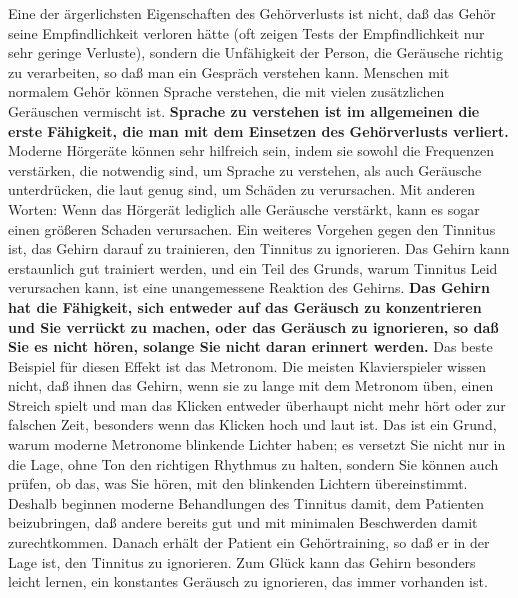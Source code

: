 Eine der ärgerlichsten Eigenschaften des Gehörverlusts ist nicht, daß das Gehör seine Empfindlichkeit verloren hätte (oft zeigen Tests der Empfindlichkeit nur sehr geringe Verluste), sondern die Unfähigkeit der Person, die Geräusche richtig zu verarbeiten, so daß man ein Gespräch verstehen kann.
Menschen mit normalem Gehör können Sprache verstehen, die mit vielen zusätzlichen Geräuschen vermischt ist.
\textbf{Sprache zu verstehen ist im allgemeinen die erste Fähigkeit, die man mit dem Einsetzen des Gehörverlusts verliert.}
Moderne Hörgeräte können sehr hilfreich sein, indem sie sowohl die Frequenzen verstärken, die notwendig sind, um Sprache zu verstehen, als auch Geräusche unterdrücken, die laut genug sind, um Schäden zu verursachen.
Mit anderen Worten: Wenn das Hörgerät lediglich alle Geräusche verstärkt, kann es sogar einen größeren Schaden verursachen.
Ein weiteres Vorgehen gegen den Tinnitus ist, das Gehirn darauf zu trainieren, den Tinnitus zu ignorieren.
Das Gehirn kann erstaunlich gut trainiert werden, und ein Teil des Grunds, warum Tinnitus Leid verursachen kann, ist eine unangemessene Reaktion des Gehirns.
\textbf{Das Gehirn hat die Fähigkeit, sich entweder auf das Geräusch zu konzentrieren und Sie verrückt zu machen, oder das Geräusch zu ignorieren, so daß Sie es nicht hören, solange Sie nicht daran erinnert werden.}
Das beste Beispiel für diesen Effekt ist das Metronom.
Die meisten Klavierspieler wissen nicht, daß ihnen das Gehirn, wenn sie zu lange mit dem Metronom üben, einen Streich spielt und man das Klicken entweder überhaupt nicht mehr hört oder zur falschen Zeit, besonders wenn das Klicken hoch und laut ist.
Das ist ein Grund, warum moderne Metronome blinkende Lichter haben; es versetzt Sie nicht nur in die Lage, ohne Ton den richtigen Rhythmus zu halten, sondern Sie können auch prüfen, ob das, was Sie hören, mit den blinkenden Lichtern übereinstimmt.
Deshalb beginnen moderne Behandlungen des Tinnitus damit, dem Patienten beizubringen, daß andere bereits gut und mit minimalen Beschwerden damit zurechtkommen.
Danach erhält der Patient ein Gehörtraining, so daß er in der Lage ist, den Tinnitus zu ignorieren.
Zum Glück kann das Gehirn besonders leicht lernen, ein konstantes Geräusch zu ignorieren, das immer vorhanden ist.

